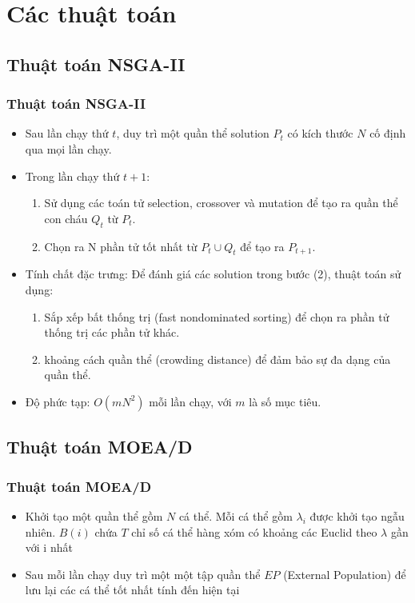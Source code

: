 \documentclass{beamer}
\begin{document}
\section{\textbf{Các thuật toán}}
\subsection{\textbf{Thuật toán NSGA-II}}
    \begin{frame}
    \frametitle{\textbf{Thuật toán NSGA-II}}
        \begin{itemize}
            \item<1-> Sau lần chạy thứ $ t $, duy trì một quần thể solution $ P_t $ có kích thước $ N $ cố định qua mọi lần chạy.
            \item<2-> Trong lần chạy thứ $ t + 1 $:
            \begin{enumerate}
                \item<2-> Sử dụng các toán tử selection, crossover và mutation để tạo ra quần thể con cháu $ Q_t $ từ $ P_t $.
                \item<2-> Chọn ra N phần tử tốt nhất từ $ P_t \cup Q_t $ để tạo ra $ P_{t + 1} $.
            \end{enumerate}
            \item<3-> Tính chất đặc trưng: Để đánh giá các solution trong bước (2), thuật toán sử dụng:
            \begin{enumerate}
                \item<3-> Sắp xếp bất thống trị (fast nondominated sorting) để chọn ra phần tử thống trị các phần tử khác.
                \item<3-> khoảng cách quần thể (crowding distance) để đảm bảo sự đa dạng của quần thể.
            \end{enumerate}
            \item<4-> Độ phức tạp: $ O(mN^2) $ mỗi lần chạy, với $ m $ là số mục tiêu.
        \end{itemize}
    \end{frame}


\subsection{\textbf{Thuật toán MOEA/D}}
    \begin{frame}
    \frametitle{\textbf{Thuật toán MOEA/D}}
        \begin{itemize} 
            \item<1-> Khởi tạo một quần thể gồm $ N $ cá thể. Mỗi cá thể gồm $ \lambda_{i} $ được khởi tạo ngẫu nhiên.
                    $ B(i) $ chứa $ T $ chỉ số cá thể hàng xóm có khoảng các Euclid theo $ \lambda $ gần với i nhất
            \item<2-> Sau mỗi lần chạy duy trì một một tập quần thể $ EP $ (External Population) để lưu
                    lại các cá thể tốt nhất tính đến hiện tại
            
        \end{itemize}
    \end{frame}
\end{document}
